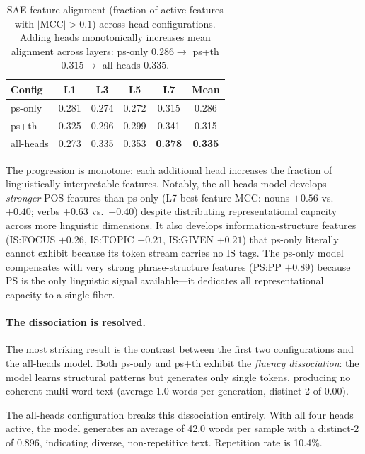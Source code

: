 \documentclass[11pt]{article}
\begin{document}
\begin{table}[t]
\centering
\small
\begin{tabular}{@{}lccccc@{}}
\toprule
\textbf{Config} & \textbf{L1} & \textbf{L3} & \textbf{L5} & \textbf{L7} & \textbf{Mean} \\
\midrule
ps-only   & 0.281 & 0.274 & 0.272 & 0.315 & 0.286 \\
ps+th     & 0.325 & 0.296 & 0.299 & 0.341 & 0.315 \\
all-heads & 0.273 & 0.335 & 0.353 & \textbf{0.378} & \textbf{0.335} \\
\bottomrule
\end{tabular}
\caption{SAE feature alignment (fraction of active features with 
$|\text{MCC}| > 0.1$) across head configurations. Adding heads 
monotonically increases mean alignment across layers: ps-only 
$0.286 \to$ ps+th $0.315 \to$ all-heads $0.335$.}
\label{tab:ablation-sae}
\end{table}

The progression is monotone: each additional head increases the fraction 
of linguistically interpretable features. Notably, the all-heads model 
develops \emph{stronger} POS features than ps-only (L7 best-feature MCC: 
nouns $+0.56$ vs.\ $+0.40$; verbs $+0.63$ vs.\ $+0.40$) despite 
distributing representational capacity across more linguistic dimensions. 
It also develops information-structure features (IS:FOCUS $+0.26$, 
IS:TOPIC $+0.21$, IS:GIVEN $+0.21$) that ps-only literally cannot 
exhibit because its token stream carries no IS tags. The ps-only model 
compensates with very strong phrase-structure features (PS:PP $+0.89$) 
because PS is the only linguistic signal available---it dedicates all 
representational capacity to a single fiber.

\paragraph{The dissociation is resolved.}
The most striking result is the contrast between the first two 
configurations and the all-heads model. Both ps-only and ps+th exhibit 
the \emph{fluency dissociation}: the 
model learns structural patterns but generates only single tokens, 
producing no coherent multi-word text (average 1.0 words per generation, 
distinct-2 of 0.00).

The all-heads configuration breaks this dissociation entirely. With all 
four heads active, the model generates an average of 42.0 words per 
sample with a distinct-2 of 0.896, indicating diverse, non-repetitive 
text. Repetition rate is 10.4\%.
\end{document}
